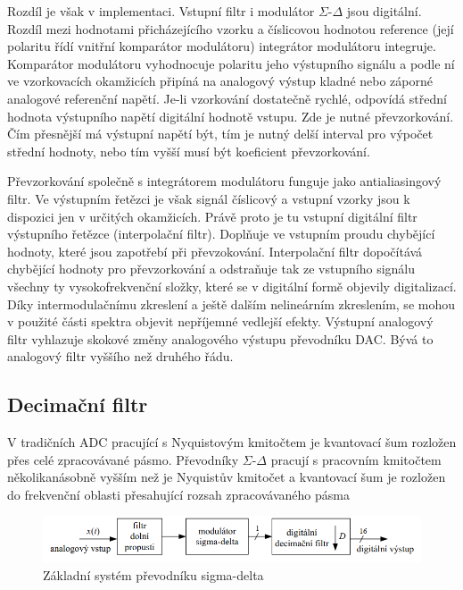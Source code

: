 Rozdíl je však v implementaci. Vstupní filtr i modulátor $\Sigma$-$\Delta$ jsou digitální. Rozdíl
mezi hodnotami přicházejícího vzorku a číslicovou hodnotou reference (její polaritu řídí
vnitřní komparátor modulátoru) integrátor modulátoru integruje. Komparátor modulátoru
vyhodnocuje polaritu jeho výstupního signálu a podle ní ve vzorkovacích okamžicích připíná
na analogový výstup kladné nebo záporné analogové referenční napětí. Je-li vzorkování
dostatečně rychlé, odpovídá střední hodnota výstupního napětí digitální hodnotě vstupu. Zde
je nutné převzorkování. Čím přesnější má výstupní napětí být, tím je nutný delší interval pro
výpočet střední hodnoty, nebo tím vyšší musí být koeficient převzorkování.

Převzorkování společně s integrátorem modulátoru funguje jako antialiasingový filtr.
Ve výstupním řetězci je však signál číslicový a vstupní vzorky jsou k dispozici jen v určitých
okamžicích. Právě proto je tu vstupní digitální filtr výstupního řetězce (interpolační filtr).
Doplňuje ve vstupním proudu chybějící hodnoty, které jsou zapotřebí při převzokování.
Interpolační filtr dopočítává chybějící hodnoty pro převzorkování a odstraňuje tak ze
vstupního signálu všechny ty vysokofrekvenční složky, které se v digitální formě objevily digitalizací. Díky intermodulačnímu zkreslení a ještě dalším nelineárním zkreslením, se
mohou v použité části spektra objevit nepříjemné vedlejší efekty. Výstupní analogový filtr
vyhlazuje skokové změny analogového výstupu převodníku DAC. Bývá to analogový filtr
vyššího než druhého řádu.

\subsection{Decimační filtr}
V tradičních ADC pracující s Nyquistovým kmitočtem je kvantovací šum rozložen přes celé zpracovávané pásmo. Převodníky $\Sigma$-$\Delta$ pracují s pracovním kmitočtem několikanásobně vyšším než je Nyquistův kmitočet a kvantovací šum je rozložen do frekvenční oblasti přesahující rozsah zpracovávaného pásma
\begin{figure}[h]
   \begin{center}
     \includegraphics[scale=0.6]{images/sigmazak.png}
   \end{center}
   \caption{Základní systém převodníku sigma-delta}
\end{figure}

